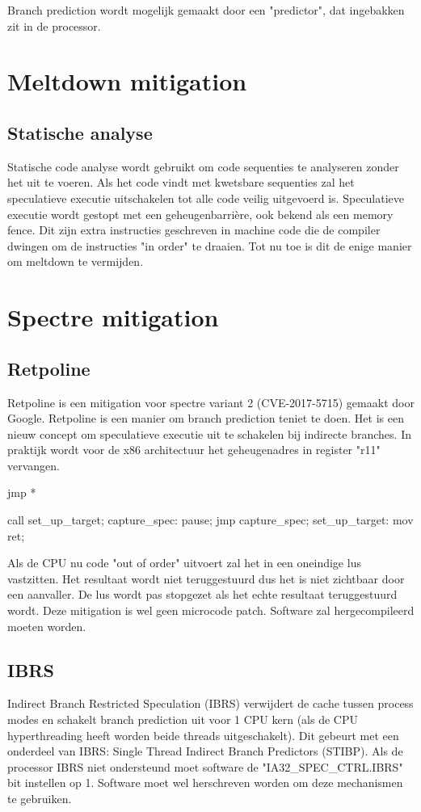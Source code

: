 Branch prediction wordt mogelijk gemaakt door een "predictor", dat ingebakken zit in de processor.


\section{Meltdown mitigation}
\subsection{Statische analyse}
Statische code analyse wordt gebruikt om code sequenties te analyseren zonder het uit te voeren. Als het code vindt met kwetsbare sequenties zal het speculatieve executie uitschakelen tot alle code veilig uitgevoerd is.
Speculatieve executie wordt gestopt met een geheugenbarrière, ook bekend als een memory fence. Dit zijn extra instructies geschreven in machine code die de compiler dwingen om de instructies "in order" te draaien.
Tot nu toe is dit de enige manier om meltdown te vermijden.

\section{Spectre mitigation}
\subsection{Retpoline}
Retpoline is een mitigation voor spectre variant 2 (CVE-2017-5715) gemaakt door Google.
Retpoline is een manier om branch prediction teniet te doen.
Het is een nieuw concept om speculatieve executie uit te schakelen bij indirecte branches.
In praktijk wordt voor de x86 architectuur het geheugenadres in register "r11" vervangen.

jmp *%

 call set_up_target;
capture_spec:         
pause;
jmp capture_spec;
set_up_target:
mov %
ret;                  
\parencite{Turner2018}

Als de CPU nu code "out of order" uitvoert zal het in een oneindige lus vastzitten. Het resultaat wordt niet teruggestuurd dus het is niet zichtbaar door een aanvaller.
De lus wordt pas stopgezet als het echte resultaat teruggestuurd wordt.
Deze mitigation is wel geen microcode patch. Software zal hergecompileerd moeten worden.


\subsection{IBRS}

Indirect Branch Restricted Speculation (IBRS) verwijdert de cache tussen process modes en schakelt branch prediction uit voor 1 CPU kern (als de CPU hyperthreading heeft worden beide threads uitgeschakelt). Dit gebeurt met een onderdeel van IBRS: Single Thread Indirect Branch Predictors (STIBP).
Als de processor IBRS niet ondersteund moet software de "IA32_SPEC_CTRL.IBRS" bit instellen op 1.
Software moet wel herschreven worden om deze mechanismen te gebruiken.

\parencite{Intel2018}